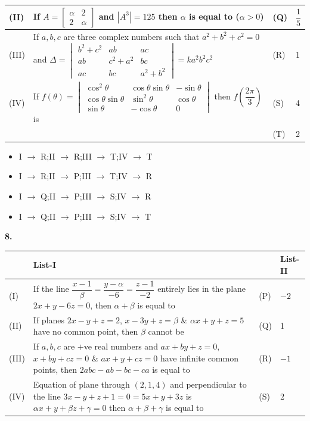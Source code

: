 \documentclass[10pt]{extarticle}
\newcommand{\qn}[1]{\par\smallskip\noindent\textbf{#1.}~}
\newenvironment{qoptions}{\begin{itemize}[leftmargin=1.8em,itemsep=1pt,topsep=2pt,label={}]}{\end{itemize}}
\newcommand{\opt}[2]{\item[(#1)] #2}
\begin{document}
\begin{multicols}{2}
\begin{center}
\begin{tabular}{|L{0.6cm}L{4.9cm}|L{0.6cm}L{0.7cm}|}
(II)&If $A=\begin{bmatrix}\alpha&2\\2&\alpha\end{bmatrix}$ and $|A^3|=125$ then $\alpha$ is equal to ($\alpha>0$)&(Q)&$\dfrac15$\\\hline
(III)&If $a,b,c$ are three complex numbers such that $a^2+b^2+c^2=0$ and $\Delta=\begin{vmatrix}b^2+c^2&ab&ac\\ab&c^2+a^2&bc\\ac&bc&a^2+b^2\end{vmatrix}=ka^2b^2c^2$&(R)&1\\\hline
(IV)&If $f(\theta)=\begin{vmatrix}\cos^2\theta&\cos\theta\sin\theta&-\sin\theta\\\cos\theta\sin\theta&\sin^2\theta&\cos\theta\\\sin\theta&-\cos\theta&0\end{vmatrix}$ then $f\left(\dfrac{2\pi}3\right)$ is&(S)&4\\\hline
&&(T)&2\\\hline
\end{tabular}\end{center}
\begin{qoptions}
\opt{A}{I $\to$ R;II $\to$ R;III $\to$ T;IV $\to$ T}
\opt{B}{I $\to$ R;II $\to$ P;III $\to$ T;IV $\to$ R}
\opt{C}{I $\to$ Q;II $\to$ P;III $\to$ S;IV $\to$ R}
\opt{D}{I $\to$ Q;II $\to$ P;III $\to$ S;IV $\to$ T}
\end{qoptions}
\qn{8} \begin{center}\footnotesize\setlength{\tabcolsep}{1pt}
\begin{tabular}{|L{0.6cm}L{4.8cm}|L{0.6cm}L{0.7cm}|}\hline
&List-I&&List-II\\\hline
(I)&If the line $\dfrac{x-1}\beta=\dfrac{y-\alpha}{-6}=\dfrac{z-1}{-2}$ entirely lies in the plane $2x+y-6z=0$, then $\alpha+\beta$ is equal to&(P)&$-2$\\\hline
(II)&If planes $2x-y+z=2$, $x-3y+z=\beta$ \& $\alpha x+y+z=5$ have no common point, then $\beta$ cannot be&(Q)&1\\\hline
(III)&If $a,b,c$ are $+$ve real numbers and $ax+by+z=0$, $x+by+cz=0$ \& $ax+y+cz=0$ have infinite common points, then $2abc-ab-bc-ca$ is equal to&(R)&$-1$\\\hline
(IV)&Equation of plane through $(2,1,4)$ and perpendicular to the line $3x-y+z+1=0=5x+y+3z$ is $\alpha x+y+\beta z+\gamma=0$ then $\alpha+\beta+\gamma$ is equal to&(S)&2\\\hline

\end{tabular}
\end{center}
\end{multicols}
\end{document}
